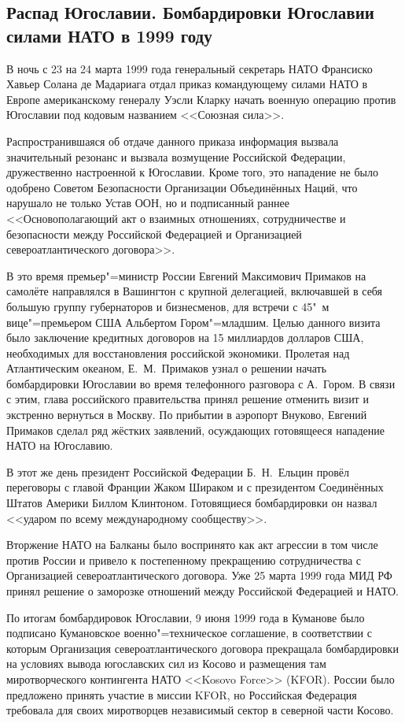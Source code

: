 \subsection{Распад Югославии. Бомбардировки Югославии силами НАТО в 1999 году}
В ночь с 23 на 24 марта 1999 года генеральный секретарь НАТО Франсиско Хавьер Солана де Мадариага отдал приказ командующему силами НАТО в Европе американскому генералу Уэсли Кларку начать военную операцию против Югославии под кодовым названием <<Союзная сила>>.

Распространившаяся об отдаче данного приказа информация вызвала значительный резонанс и вызвала возмущение Российской Федерации, дружественно настроенной к Югославии. Кроме того, это нападение не было одобрено Советом Безопасности Организации Объединённых Наций, что нарушало не только Устав ООН, но и подписанный раннее <<Основополагающий акт о взаимных отношениях, сотрудничестве и безопасности между Российской Федерацией и Организацией североатлантического договора>>. 

В это время премьер"=министр России Евгений Максимович Примаков на самолёте направлялся в Вашингтон с крупной делегацией, включавшей в себя большую группу губернаторов и бизнесменов, для встречи с 45"~м вице"=премьером США Альбертом Гором"=младшим. Целью данного визита было заключение кредитных договоров на 15 миллиардов долларов США, необходимых для восстановления российской экономики. Пролетая над Атлантическим океаном, Е.~М.~Примаков узнал о решении начать бомбардировки Югославии во время телефонного разговора с А.~Гором. В связи с этим, глава российского правительства принял решение отменить визит и экстренно вернуться в Москву. По прибытии в аэропорт Внуково, Евгений Примаков сделал ряд жёстких заявлений, осуждающих готовящееся нападение НАТО на Югославию.

В этот же день президент Российской Федерации Б.~Н.~Ельцин провёл переговоры с главой Франции Жаком Шираком и с президентом Соединённых Штатов Америки Биллом Клинтоном. Готовящиеся бомбардировки он назвал <<ударом по всему международному сообществу>>.

Вторжение НАТО на Балканы было воспринято как акт агрессии в том числе против России и привело к постепенному прекращению сотрудничества с Организацией североатлантического договора. Уже 25 марта 1999 года МИД РФ принял решение о заморозке отношений между Российской Федерацией и НАТО.

По итогам бомбардировок Югославии, 9 июня 1999 года в Куманове было подписано Кумановское военно"=техническое соглашение, в соответствии с которым Организация североатлантического договора прекращала бомбардировки на условиях вывода югославских сил из Косово и размещения там миротворческого контингента НАТО <<Kosovo Force>> (KFOR). России было предложено принять участие в миссии KFOR, но Российская Федерация требовала для своих миротворцев независимый сектор в северной части Косово.

